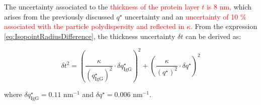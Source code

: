 The uncertainty associated to the \textcolor{red}{thickness of the protein layer $t$ is 8 nm,} which arises from the previously discussed $q^{\star}$ uncertainty and an \textcolor{red}{uncertainty of 10 $\%$ associated with the particle polydispersity and reflected in $\kappa$.} From the expression \ref{eq:IsopointRadiusDifference}, the thickness uncertainty $\delta t$ can be derived as:

\begin{equation}
\delta t^2 = \left( \frac{\kappa}{\left(q^{\star}_{\text{IgG}}\right)^2} \cdot \delta q^{\star}_{\text{IgG}} \right)^2 + \left( \frac{\kappa}{\left(q^{\star}\right)^2} \cdot \delta q^{\star}\right)^2
\end{equation}

where $\delta q^{\star}_{\text{IgG}}=0.11$ nm$^{-1}$ and $\delta q^{\star}=0.006$ nm$^{-1}$.
